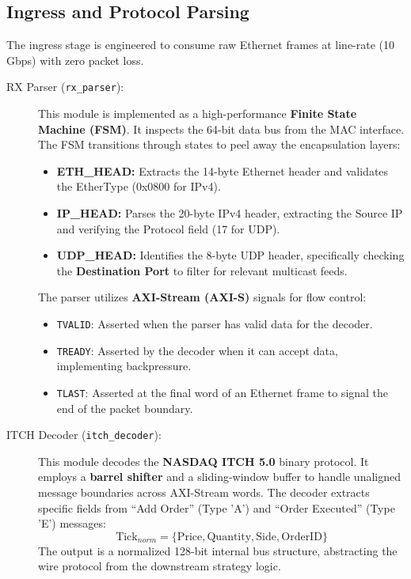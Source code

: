 \subsection{Ingress and Protocol Parsing}
The ingress stage is engineered to consume raw Ethernet frames at line-rate (10 Gbps) with zero packet loss. \datamethodology
\begin{description}
    \item[RX Parser (\texttt{rx\_parser}):] This module is implemented as a high-performance \textbf{Finite State Machine (FSM)}. It inspects the 64-bit data bus from the MAC interface. The FSM transitions through states to peel away the encapsulation layers:
    \begin{itemize}
        \item \textbf{ETH\_HEAD:} Extracts the 14-byte Ethernet header and validates the EtherType (0x0800 for IPv4).
        \item \textbf{IP\_HEAD:} Parses the 20-byte IPv4 header, extracting the Source IP and verifying the Protocol field (17 for UDP).
        \item \textbf{UDP\_HEAD:} Identifies the 8-byte UDP header, specifically checking the \textbf{Destination Port} to filter for relevant multicast feeds.
    \end{itemize}
    The parser utilizes \textbf{AXI-Stream (AXI-S)} signals for flow control:
    \begin{itemize}
        \item \texttt{TVALID}: Asserted when the parser has valid data for the decoder.
        \item \texttt{TREADY}: Asserted by the decoder when it can accept data, implementing backpressure.
        \item \texttt{TLAST}: Asserted at the final word of an Ethernet frame to signal the end of the packet boundary.
    \end{itemize}

    \item[ITCH Decoder (\texttt{itch\_decoder}):] This module decodes the \textbf{NASDAQ ITCH 5.0} binary protocol. It employs a \textbf{barrel shifter} and a sliding-window buffer to handle unaligned message boundaries across AXI-Stream words. The decoder extracts specific fields from ``Add Order'' (Type 'A') and ``Order Executed'' (Type 'E') messages:
    \begin{equation}
        \text{Tick}_{norm} = \{ \text{Price}, \text{Quantity}, \text{Side}, \text{OrderID} \}
    \end{equation}
    The output is a normalized 128-bit internal bus structure, abstracting the wire protocol from the downstream strategy logic.
\end{description}

